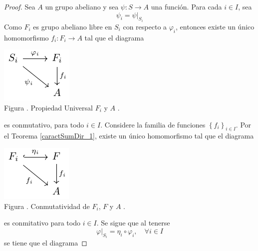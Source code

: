 \documentclass[12pt]{report}
\newcounter{it}
\theoremstyle{largebreak}
\newcommand\cf[3]{\ensuremath{#1:#2\rightarrow#3}}
\newcounter{figcount}
\begin{document}
    \begin{proof}
        Sea $A$ un grupo abeliano y sea $\cf{\psi}{S}{A}$ una función. Para cada $i\in I$, sea
        \begin{equation*}
            \psi_i=\psi\big|_{S_i}
        \end{equation*}
        Como $F_i$ es grupo abeliano libre en $S_i$ con respecto a $\varphi_i$, entonces existe un único homomorfismo $\cf{f_i}{F_i}{A}$ tal que el diagrama
        
        \begin{minipage}{\textwidth}
            \begin{center}
                \includegraphics[scale=1.5]{images/fig_7.pdf}\\
                Figura \thefigcount. Propiedad Universal $F_i$ y $A$ .
            \end{center}
        \end{minipage}

        es conmutativo, para todo $i\in I$. Considere la familia de funciones $\left\{f_i \right\}_{i\in I}$. Por el Teorema \ref{caractSumDir_1}, existe un único homomorfismo tal que el diagrama

        \begin{minipage}{\textwidth}
            \begin{center}
                \includegraphics[scale=1.5]{images/fig_8.pdf}\\
                Figura \thefigcount. Conmutatividad de $F_i$, $F$ y $A$ .
            \end{center}
        \end{minipage}

        es conmitativo para todo $i\in I$. Se sigue que al tenerse
        \begin{equation*}
            \varphi\big|_{S_i}=\eta_i\circ\varphi_i,\quad\forall i\in I
        \end{equation*}
        se tiene que el diagrama


\end{proof}
\end{document}
